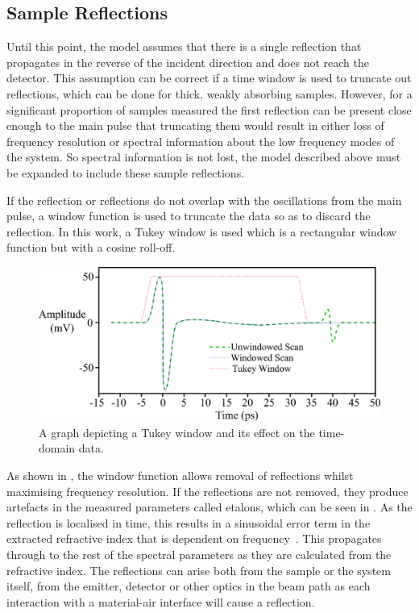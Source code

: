 \subsection{Sample Reflections}
\label{subsec:Reflections}
Until this point, the model assumes that there is a single reflection that propagates in the reverse of the incident direction and does not reach the detector. This assumption can be correct if a time window is used to truncate out reflections, which can be done for thick, weakly absorbing samples. However, for a significant proportion of samples measured the first reflection can be present close enough to the main pulse that truncating them would result in either loss of frequency resolution or spectral information about the low frequency modes of the system. So spectral information is not lost, the model described above must be expanded to include these sample reflections.

If the reflection or reflections do not overlap with the oscillations from the main pulse, a window function is used to truncate the data so as to discard the reflection.  In this work, a Tukey window is used which is a rectangular window function but with a cosine roll-off.

\begin{figure}
    \centering
    \includegraphics{Figures/Misc/Theory/Window.png}
    \captionsetup{font = footnotesize, justification = centering}
    \caption[A Graph depicting a Tukey Window and its Effect on the Time-Domain Data]{A graph depicting a Tukey window and its effect on the time-domain data.}
    \label{fig:window}
\end{figure}

As shown in , the window function allows removal of reflections whilst maximising frequency resolution. If the reflections are not removed, they produce artefacts in the measured parameters called etalons, which can be seen in . As the reflection is localised in time, this results in a sinusoidal error term in the extracted refractive index that is dependent on frequency~\cite{Greenall2017}. This propagates through to the rest of the spectral parameters as they are calculated from the refractive index.
The reflections can arise both from the sample or the system itself, from the emitter, detector or other optics in the beam path as each interaction with a material-air interface will cause a reflection.

